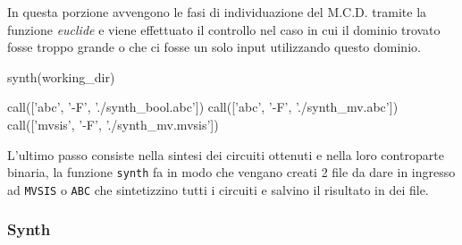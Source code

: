 \documentclass[italian,]{book}
\newenvironment{Shaded}{\begin{snugshade}}{\end{snugshade}}
\newcommand{\BuiltInTok}[1]{#1}
\newcommand{\ControlFlowTok}[1]{\textcolor[rgb]{0.13,0.29,0.53}{\textbf{#1}}}
\newcommand{\DecValTok}[1]{\textcolor[rgb]{0.00,0.00,0.81}{#1}}
\newcommand{\KeywordTok}[1]{\textcolor[rgb]{0.13,0.29,0.53}{\textbf{#1}}}
\newcommand{\NormalTok}[1]{#1}
\newcommand{\OperatorTok}[1]{\textcolor[rgb]{0.81,0.36,0.00}{\textbf{#1}}}
\newcommand{\StringTok}[1]{\textcolor[rgb]{0.31,0.60,0.02}{#1}}
\begin{document}
\newpage

\begin{Shaded}
\end{Shaded}

In questa porzione avvengono le fasi di individuazione del M.C.D. tramite la funzione \emph{euclide} e viene effettuato il controllo nel caso in cui il dominio trovato fosse troppo grande o che ci fosse un solo input utilizzando questo dominio.

\begin{Shaded}
\begin{Highlighting}[]
\NormalTok{synth(working_dir)}

\NormalTok{call([}\StringTok{'abc'}\NormalTok{, }\StringTok{'-F'}\NormalTok{, }\StringTok{'./synth_bool.abc'}\NormalTok{])}
\NormalTok{call([}\StringTok{'abc'}\NormalTok{, }\StringTok{'-F'}\NormalTok{, }\StringTok{'./synth_mv.abc'}\NormalTok{])}
\NormalTok{call([}\StringTok{'mvsis'}\NormalTok{, }\StringTok{'-F'}\NormalTok{, }\StringTok{'./synth_mv.mvsis'}\NormalTok{])}
\end{Highlighting}
\end{Shaded}

L'ultimo passo consiste nella sintesi dei circuiti ottenuti e nella loro controparte binaria, la funzione \texttt{synth} fa in modo che vengano creati 2 file da dare in ingresso ad \texttt{MVSIS} o \texttt{ABC} che sintetizzino tutti i circuiti e salvino il risultato in dei file.

\hypertarget{synth}{%
\subsubsection{Synth}\label{synth}}
\end{document}
